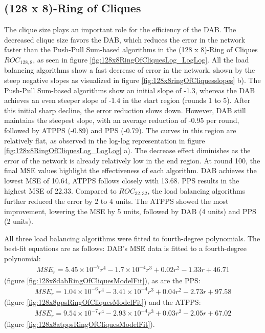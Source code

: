 \subsection{(128 x 8)-Ring of Cliques}\label{subsec:128_8ROC}
The clique size plays an important role for the efficiency of the DAB. The decreased clique size favors the DAB, which reduces the error in the network faster than the Push-Pull Sum-based algorithms in the (128 x 8)-Ring of Cliques $ROC_{128,8}$, as seen in figure \ref{fig:128x8RingOfCliquesLog_LogLog}. All the load balancing algorithms show a fast decrease of error in the network, shown by the steep negative slopes as visualized in figure \ref{fig:128x8ringOfCliquesslopes} b). The Push-Pull Sum-based algorithms show an initial slope of -1.3, whereas the DAB achieves an even steeper slope of -1.4 in the start region (rounds 1 to 5). After this initial sharp decline, the error reduction slows down. However, DAB still maintains the steepest slope, with an average reduction of -0.95 per round, followed by ATPPS (-0.89) and PPS (-0.79). The curves in this region are relatively flat, as observed in the log-log representation in figure \ref{fig:128x8RingOfCliquesLog_LogLog} a). The decrease effect diminishes as the error of the network is already relatively low in the end region. At round 100, the final MSE values highlight the effectiveness of each algorithm. DAB achieves the lowest MSE of 10.64, ATPPS follows closely with 13.68. PPS results in the highest MSE of 22.33. Compared to $ROC_{32,32}$, the load balancing algorithms further reduced the error by 2 to 4 units. The ATPPS showed the most improvement, lowering the MSE by 5 units, followed by DAB (4 units) and PPS (2 units).

All three load balancing algorithms were fitted to fourth-degree polynomials. The best-fit equations are as follows: DAB's MSE data is fitted to a fourth-degree polynomial:
\begin{align}
    MSE_r=5.45\times 10 ^{-7}r^{4}-1.7\times 10^{-4}r^{3}+0.02r^{2}-1.33r+46.71    
\end{align}
(figure \ref{fig:128x8dabRingOfCliquesModelFit}), as are the PPS:
\begin{align}
    MSE_r=1.04\times 10 ^{-6}r^{4}-3.41\times 10^{-4}r^{3}+0.04r^{2}-2.73r+97.58    
\end{align}
(figure \ref{fig:128x8ppsRingOfCliquesModelFit}) and the ATPPS:
\begin{align}
    MSE_r=9.54\times 10^{-7}r^{4}-2.93\times 10^{-4}r^{3}+0.03r^{2}-2.05r+67.02    
\end{align}
(figure \ref{fig:128x8atppsRingOfCliquesModelFit}).

